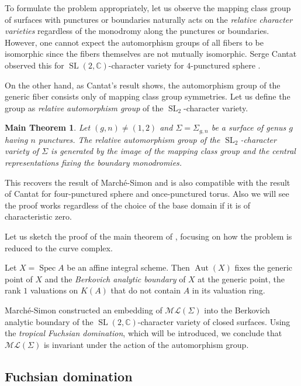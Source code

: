 \documentclass[11pt]{amsart}
\numberwithin{theorem}{section}
\newtheorem*{maintheorem}{Main Theorem}
\theoremstyle{definition}
\theoremstyle{remark}
\newcommand{\C}{{\mathbb{C}}}
\DeclareMathOperator{\Aut}{Aut}
\DeclareMathOperator{\SL}{SL}
\DeclareMathOperator{\Spec}{Spec}
\newcommand{\<}{\langle}
\renewcommand{\>}{\rangle}
\begin{document}
To formulate the problem appropriately, let us observe the mapping class group of surfaces with punctures or boundaries naturally acts on the \textit{relative character varieties} regardless of the monodromy along the punctures or boundaries. However, one cannot expect the automorphism groups of all fibers to be isomorphic since the fibers themselves are not mutually isomorphic. Serge Cantat observed this for $\SL(2, \C)$-character variety for $4$-punctured sphere \cite{cantat2007holomorphic}.

On the other hand, as Cantat's result \cite{cantat2007holomorphic} shows, the automorphism group of the generic fiber consists only of mapping class group symmetries. Let us define the group as \textit{relative automorphism group} of the $\SL_2$-character variety.

\begin{maintheorem}
    Let $(g, n) \neq (1, 2)$ and $\Sigma = \Sigma_{g, n}$ be a surface of genus $g$ having $n$ punctures. The relative automorphism group of the $\SL_2$-character variety of $\Sigma$ is generated by the image of the mapping class group and the central representations fixing the boundary monodromies.
\end{maintheorem}

This recovers the result of March\'e-Simon \cite{marche2021automorphisms} and is also compatible with the result of Cantat \cite{cantat2007holomorphic} for four-punctured sphere and once-punctured torus. Also we will see the proof works regardless of the choice of the base domain if it is of characteristic zero.

Let us sketch the proof of the main theorem of \cite{marche2021automorphisms}, focusing on how the problem is reduced to the curve complex. 

Let $X = \Spec A$ be an affine integral scheme. Then $\Aut(X)$ fixes the generic point of $X$ and the \textit{Berkovich analytic boundary} of $X$ at the generic point, the rank $1$ valuations on $K(A)$ that do not contain $A$ in its valuation ring. 

March\'e-Simon constructed an embedding of $\mathcal{ML}(\Sigma)$ into the Berkovich analytic boundary of the $\SL(2, \C)$-character variety of closed surfaces. Using the \textit{tropical Fuchsian domination}, which will be introduced, we conclude that $\mathcal{ML}(\Sigma)$ is invariant under the action of the automorphism group.

\subsection*{Fuchsian domination}
\end{document}
